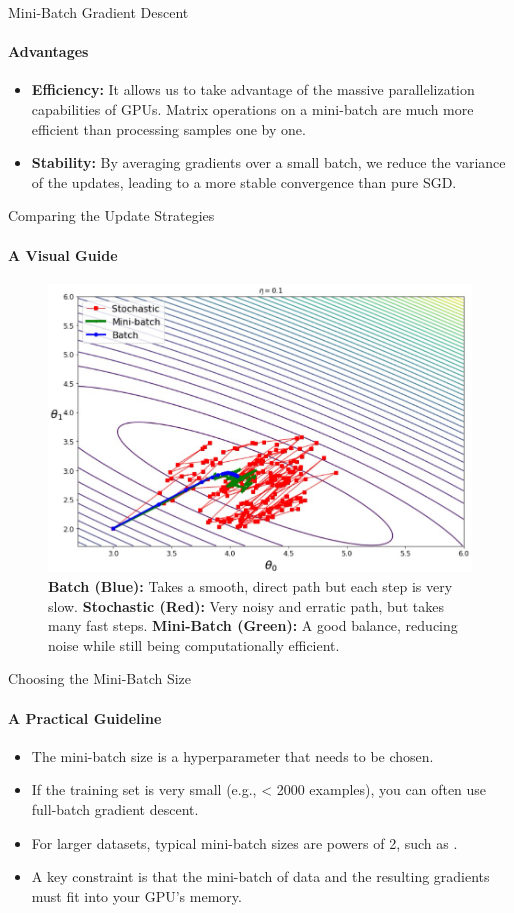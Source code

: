 \begin{frame}{Mini-Batch Gradient Descent}
    \framesubtitle{Advantages}
    \begin{itemize}
        \item \textbf{Efficiency:} It allows us to take advantage of the massive parallelization capabilities of GPUs. Matrix operations on a mini-batch are much more efficient than processing samples one by one.
        \item \textbf{Stability:} By averaging gradients over a small batch, we reduce the variance of the updates, leading to a more stable convergence than pure SGD.
    \end{itemize}
\end{frame}

\begin{frame}{Comparing the Update Strategies}
    \framesubtitle{A Visual Guide}
    \begin{figure}
        \centering
        \includegraphics[width=0.9\linewidth]{images/optimizer_paths.png}
        \caption{
            \textbf{Batch (Blue):} Takes a smooth, direct path but each step is very slow.
            \textbf{Stochastic (Red):} Very noisy and erratic path, but takes many fast steps.
            \textbf{Mini-Batch (Green):} A good balance, reducing noise while still being computationally efficient.
        }
    \end{figure}
\end{frame}

\begin{frame}{Choosing the Mini-Batch Size}
    \framesubtitle{A Practical Guideline}
    \begin{itemize}
        \item The mini-batch size is a hyperparameter that needs to be chosen.
        \item If the training set is very small (e.g., < 2000 examples), you can often use full-batch gradient descent.
        \item For larger datasets, typical mini-batch sizes are powers of 2, such as .
        \item A key constraint is that the mini-batch of data and the resulting gradients must fit into your GPU's memory.
    \end{itemize}
\end{frame}